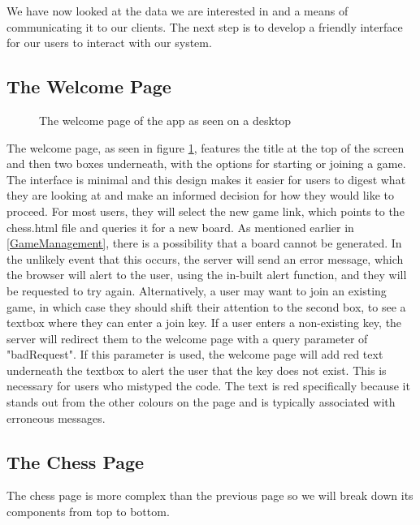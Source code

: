 We have now looked at the data we are interested in and a means of communicating it to our clients. The next step is to develop a friendly interface for our users to interact with our system.

\subsection{The Welcome Page}

\begin{figure}
    \begin{center}
        \caption{The welcome page of the app as seen on a desktop}
        \label{fig:welcomePage}
    \end{center}
\end{figure}

The welcome page, as seen in figure \ref{fig:welcomePage}, features the title at the top of the screen and then two boxes underneath, with the options for starting or joining a game. The interface is minimal and this design makes it easier for users to digest what they are looking at and make an informed decision for how they would like to proceed. For most users, they will select the new game link, which points to the chess.html file and queries it for a new board. As mentioned earlier in \ref{GameManagement}, there is a possibility that a board cannot be generated. In the unlikely event that this occurs, the server will send an error message, which the browser will alert to the user, using the in-built alert function, and they will be requested to try again. Alternatively, a user may want to join an existing game, in which case they should shift their attention to the second box, to see a textbox where they can enter a join key. If a user enters a non-existing key, the server will redirect them to the welcome page with a query parameter of "badRequest". If this parameter is used, the welcome page will add red text underneath the textbox to alert the user that the key does not exist. This is necessary for users who mistyped the code. The text is red specifically because it stands out from the other colours on the page and is typically associated with erroneous messages.

\subsection{The Chess Page}

The chess page is more complex than the previous page so we will break down its components from top to bottom.

